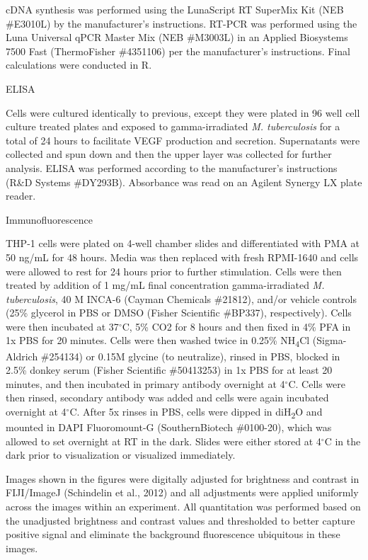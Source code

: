 cDNA synthesis was performed using the LunaScript RT SuperMix Kit (NEB \#E3010L) by the manufacturer's instructions. RT-PCR was performed using the Luna Universal qPCR Master Mix (NEB \#M3003L) in an Applied Biosystems 7500 Fast (ThermoFisher \#4351106) per the manufacturer's instructions. Final calculations were conducted in R. 

ELISA

Cells were cultured identically to previous, except they were plated in 96 well cell culture treated plates and exposed to gamma-irradiated \textit{M. tuberculosis} for a total of 24 hours to facilitate VEGF production and secretion. Supernatants were collected and spun down and then the upper layer was collected for further analysis. ELISA was performed according to the manufacturer's instructions (R\&D Systems \#DY293B). Absorbance was read on an Agilent Synergy LX plate reader.

Immunofluorescence

THP-1 cells were plated on 4-well chamber slides and differentiated with PMA at 50 ng/mL for 48 hours. Media was then replaced with fresh RPMI-1640 and cells were allowed to rest for 24 hours prior to further stimulation. Cells were then treated by addition of 1 mg/mL final concentration gamma-irradiated \textit{M. tuberculosis}, 40 \textmu M INCA-6 (Cayman Chemicals \#21812), and/or vehicle controls (25\% glycerol in PBS or DMSO (Fisher Scientific \#BP337), respectively). Cells were then incubated at 37$^{\circ}$C, 5\% CO2 for 8 hours and then fixed in 4\% PFA in 1x PBS for 20 minutes. Cells were then washed twice in 0.25\% NH\textsubscript{4}Cl (Sigma-Aldrich \#254134) or 0.15M glycine (to neutralize), rinsed in PBS, blocked in 2.5\% donkey serum (Fisher Scientific \#50413253) in 1x PBS for at least 20 minutes, and then incubated in primary antibody overnight at 4$^{\circ}$C. Cells were then rinsed, secondary antibody was added and cells were again incubated overnight at 4$^{\circ}$C. After 5x rinses in PBS, cells were dipped in diH\textsubscript{2}O and mounted in DAPI Fluoromount-G (SouthernBiotech \#0100-20), which was allowed to set overnight at RT in the dark. Slides were either stored at 4$^{\circ}$C in the dark prior to visualization or visualized immediately. 

Images shown in the figures were digitally adjusted for brightness and contrast in FIJI/ImageJ (Schindelin et al., 2012) and all adjustments were applied uniformly across the images within an experiment. All quantitation was performed based on the unadjusted brightness and contrast values and thresholded to better capture positive signal and eliminate the background fluorescence ubiquitous in these images.

